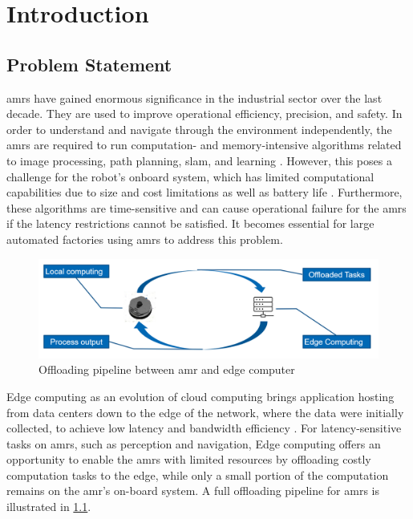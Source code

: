 \chapter{Introduction}\label{ch:introduction}

\section{Problem Statement}\label{sec:introduction:problem_statement}

\glspl{amr} have gained enormous significance in the industrial sector over the last decade. They are used to improve operational efficiency, precision, and safety. In order to understand and navigate through the environment independently, the \glspl{amr} are required to run computation- and memory-intensive algorithms related to image processing, path planning, \gls{slam}, and learning \cite{Saeik2021}. However, this poses a challenge for the robot's onboard system, which has limited computational capabilities due to size and cost limitations as well as battery life \cite{Baxi2022}. Furthermore, these algorithms are time-sensitive and can cause operational failure for the \glspl{amr} if the latency restrictions cannot be satisfied. It becomes essential for large automated factories using \glspl{amr} to address this problem. 

\begin{figure}[htb]
    \centering

    \includegraphics[width=0.8\linewidth]{figures/setup/amr_offloading.png}
    \caption{Offloading pipeline between \gls{amr} and edge computer}

    \label{fig:amr_offloading}
\end{figure}

Edge computing as an evolution of cloud computing brings application hosting from data centers down to the edge of the network, where the data were initially collected, to achieve low latency and bandwidth efficiency \cite{Lin2019}. For latency-sensitive tasks on \glspl{amr}, such as perception and navigation, Edge computing offers an opportunity to enable the \glspl{amr} with limited resources by offloading costly computation tasks to the edge, while only a small portion of the computation remains on the \gls{amr}'s on-board system. A full offloading pipeline for \glspl{amr} is illustrated in \cref{fig:amr_offloading}.


